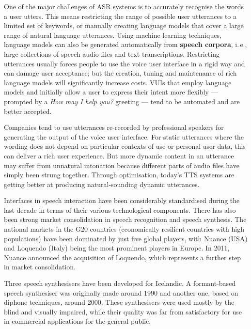 \begin{multicols}{2}
One of the major challenges of ASR systems is to accurately recognise the words a user utters. This means restricting the range of possible user utterances to a limited set of keywords, or manually creating language models that cover a large range of natural language utterances. Using machine learning techniques, language models can also be generated automatically from \textbf{speech corpora}, i.\,e., large collections of speech audio files and text transcriptions. Restricting utterances usually forces people to use the voice user interface in a rigid way and can damage user acceptance; but the creation, tuning and maintenance of rich language models will significantly increase costs. VUIs that employ language models and initially allow a user to express their intent more flexibly — prompted by a \textit{How may I help you?} greeting — tend to be automated and are better accepted.

Companies tend to use utterances re-recorded by professional speakers for generating the output of the voice user interface. For static utterances where the wording does not depend on particular contexts of use or personal user data, this can deliver a rich user experience. But more dynamic content in an utterance may suffer from unnatural intonation because different parts of audio files have simply been strung together. Through optimisation, today’s TTS systems are getting better at producing natural-sounding dynamic utterances.


Interfaces in speech interaction have been considerably standardised during the last decade in terms of their various technological components. There has also been strong market consolidation in speech recognition and speech synthesis. The national markets in the G20 countries (economically resilient countries with high populations) have been dominated by just five global players, with Nuance (USA) and Loquendo (Italy) being the most prominent players in Europe. In 2011, Nuance announced the acquisition of Loquendo, which represents a further step in market consolidation.

Three speech synthesisers have been developed for Icelandic. A formant-based speech synthesiser was originally made around 1990 and another one, based on diphone techniques, around 2000. These synthesisers were used mostly by the blind and visually impaired, while their quality was far from satisfactory for use in commercial applications for the general public.


\end{multicols}
